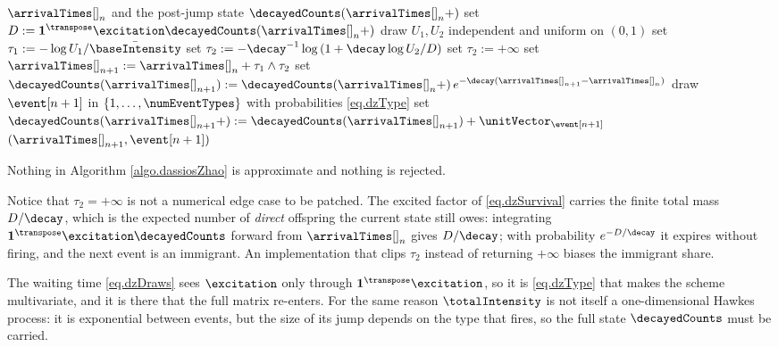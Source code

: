 \begin{algorithm}[h!]
 \caption{{The exact scheme for the exponential kernel \citep{DZ13exa}}}
 \label{algo.dassiosZhao}
 \begin{algorithmic}[5]
  \REQUIRE $\arrivalTimes[]_{n}$ and the post-jump state $\decayedCounts(\arrivalTimes[]_n+)$
  \STATE set $D := \mathbf{1}^{\transpose}\excitation \decayedCounts(\arrivalTimes[]_n +)$
  \STATE draw $U_1, U_2$ independent and uniform on $(0,1)$
  \STATE set $\tau_1 := -\log U_1 / \bar{\baseIntensity}$
  \STATE set $\tau_2 := -\decay^{-1}\log\left(1 + \decay \log U_2 / D\right)$
  \ELSE
  \STATE set $\tau_2 := +\infty$
  \ENDIF
  \STATE set $\arrivalTimes[]_{n+1} := \arrivalTimes[]_{n} + \tau_1 \wedge \tau_2$
  \STATE set $\decayedCounts(\arrivalTimes[]_{n+1}) :=
         \decayedCounts(\arrivalTimes[]_{n}+) \,
         e^{-\decay(\arrivalTimes[]_{n+1}-\arrivalTimes[]_{n})}$
  \STATE draw $\event[n+1]$ in $\lbrace 1,\dots,\numEventTypes\rbrace$ with probabilities
         \eqref{eq.dzType}
  \STATE set $\decayedCounts(\arrivalTimes[]_{n+1}+) :=
         \decayedCounts(\arrivalTimes[]_{n+1}) + \unitVector_{\event[n+1]}$
  \RETURN $(\arrivalTimes[]_{n+1}, \event[n+1])$
 \end{algorithmic}
\end{algorithm}

Nothing in Algorithm \ref{algo.dassiosZhao} is approximate and nothing is rejected.

\begin{remark}\label{remark.defectiveClock}
 Notice that $\tau_2 = +\infty$ is not a numerical edge case to be patched.
 The excited factor of \eqref{eq.dzSurvival} carries the finite total mass $D/\decay$,
 which is the expected number of \emph{direct} offspring the current state still owes:
 integrating $\mathbf{1}^{\transpose}\excitation\decayedCounts$ forward from
 $\arrivalTimes[]_n$ gives $D/\decay$;
 with probability $e^{-D/\decay}$ it expires without firing,
 and the next event is an immigrant.
 An implementation that clips $\tau_2$ instead of returning $+\infty$ biases the immigrant
 share.
\end{remark}

\begin{remark}\label{remark.typeDraw}
 The waiting time \eqref{eq.dzDraws} sees $\excitation$ only through
 $\mathbf{1}^{\transpose}\excitation$,
 so it is \eqref{eq.dzType} that makes the scheme multivariate,
 and it is there that the full matrix re-enters.
 For the same reason $\totalIntensity$ is not itself a one-dimensional Hawkes process:
 it is exponential between events, but the size of its jump depends on the type that fires,
 so the full state $\decayedCounts$ must be carried.
\end{remark}

